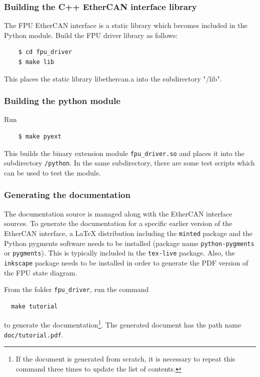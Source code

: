 \documentclass[11pt,a4paper]{report}
\begin{document}
\subsubsection{Building the C++ EtherCAN interface library}
The FPU EtherCAN interface is a static library which becomes included in the
Python module.  Build the FPU driver library as follows:

  \begin{verbatim}
    $ cd fpu_driver
    $ make lib
  \end{verbatim}    

This places the static library libethercan.a into
the subdirectory "/lib".

\subsubsection{Building the python module}

Run

  \begin{verbatim}
    $ make pyext
  \end{verbatim}    

This builds the binary extension module \verb+fpu_driver.so+
and places it into the subdirectory \verb+/python+.
In the same subdirectory, there are some test
scripts which can be used to test the module.

\subsubsection{Generating the documentation}

The documentation source is managed along with the EtherCAN interface sources.  To
generate the documentation for a specific earlier version of the
EtherCAN interface, a \LaTeX{} distribution including the \texttt{minted} package
and the Python pygments software needs to be installed (package name
\texttt{python-pygments} or \texttt{pygments}).  This is typically
included in the \texttt{tex-live} package. Also, the \texttt{inkscape}
package needs to be installed in order to generate the PDF version of
the FPU state diagram.

From the folder \texttt{fpu\_driver}, run the
command
\begin{verbatim}
  make tutorial
\end{verbatim}
to generate the documentation\footnote{If the document is generated
  from scratch, it is necessary to repeat this command three times to
  update the list of contents.}. The generated document has the path
name \texttt{doc/tutorial.pdf}.
\end{document}
